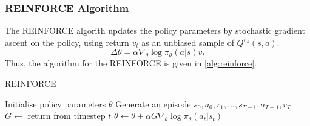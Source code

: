 \subsubsection{REINFORCE Algorithm}
The REINFORCE algorith updates the policy parameters by stochastic gradient ascent on the policy,
using return \(v_t\) as an unbiased sample of \(Q^{\pi_\theta}(s,a)\).
\[
    \Delta \theta = \alpha \nabla_\theta \log \pi_\theta(a|s) v_t
\] 
Thus, the algorithm for the REINFORCE is given in \autoref{alg:reinforce}.
\begin{algorithm}[htpb]
    \caption{REINFORCE}
    \label{alg:reinforce}
    \begin{algorithmic}[1]
        \State Initialise policy parameters \(\theta\)
            \State Generate an episode \(s_0,a_0,r_1,\dots,s_{T-1},a_{T-1},r_T\)
                \State \(G \leftarrow\) return from timestep \(t\)
                \State \(\theta \leftarrow \theta + \alpha G \nabla_\theta \log \pi_\theta(a_t|s_t)\)
            \EndFor
        \EndFor
    \end{algorithmic}
\end{algorithm}
